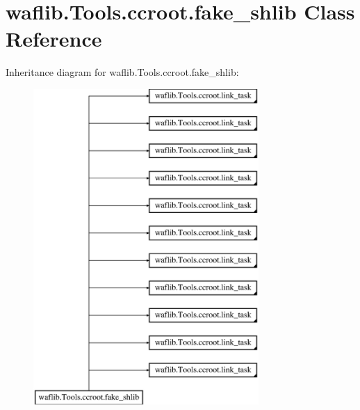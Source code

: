 \hypertarget{classwaflib_1_1_tools_1_1ccroot_1_1fake__shlib}{}\section{waflib.\+Tools.\+ccroot.\+fake\+\_\+shlib Class Reference}
\label{classwaflib_1_1_tools_1_1ccroot_1_1fake__shlib}
Inheritance diagram for waflib.\+Tools.\+ccroot.\+fake\+\_\+shlib\+:\begin{figure}[H]
\begin{center}
\leavevmode
\includegraphics[height=12.000000cm]{classwaflib_1_1_tools_1_1ccroot_1_1fake__shlib}
\end{center}
\end{figure}
